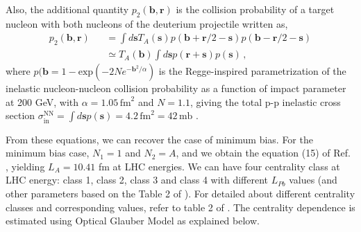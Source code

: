 \documentclass[11pt,onecolumn]{article}
\newcommand{\bqa}{\begin{eqnarray}}
\newcommand{\eqa}{\end{eqnarray}}
\begin{document}
Also, the additional quantity $p_2(\textbf{b},\textbf{r})$ is the collision probability of a target nucleon with both nucleons of the deuterium projectile written as,
%
\bqa
p_{2}(\textbf{b},\textbf{r}) &&= \int d\textbf{s} T_A(\textbf{s}) p(\textbf{b}+\textbf{r}/2-\textbf{s}) p(\textbf{b}-\textbf{r}/2-\textbf{s}) \nonumber \\
&& \simeq T_A(\textbf{b}) \int d\textbf{s} p(\textbf{r}+\textbf{s}) p(\textbf{s}) \, ,
\eqa
%
where $p(\textbf{b} = 1 - \text{exp}(-2 N e^{-\textbf{b}^2/\alpha})$ is the Regge-inspired parametrization of the inelastic nucleon-nucleon collision probability as a function of impact parameter at 200 GeV, with $\alpha = 1.05 \, \text{fm}^2$ and $N = 1.1$, giving the total p-p inelastic cross section $\sigma^{\text{NN}}_{\text{in}} = \int d\textbf{s}p(\textbf{s}) = 4.2 \, \text{fm}^2 = 42 \, \text{mb}$ \cite{Arleo:2013zua}.

From these equations, we can recover the case of minimum bias. For the minimum bias case, $N_1 = 1$ and $N_2 = A$, and we obtain the equation (15) of Ref. \cite{Strickland:2024oat}, yielding $L_A = 10.41$ fm at LHC energies. We can have four centrality class at LHC energy: class 1, class 2, class 3 and class 4 with different $L_{Pb}$ values (and other parameters based on the Table 2 of \cite{Arleo:2013zua}). For detailed about different centrality classes and corresponding values, refer to table 2 of \cite{Arleo:2013zua}. The centrality dependence is estimated using Optical Glauber Model as explained below.

\end{document}
